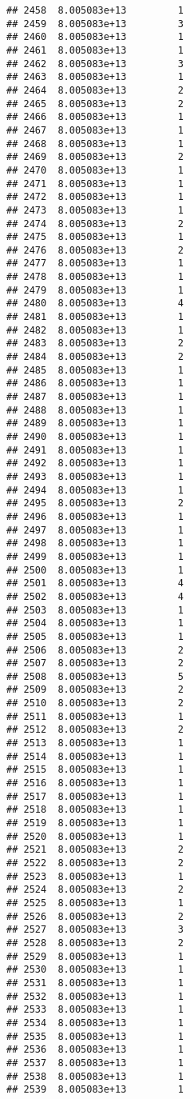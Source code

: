 \documentclass[
]{article}
\begin{document}
\begin{verbatim}
## 2458  8.005083e+13         1
## 2459  8.005083e+13         3
## 2460  8.005083e+13         1
## 2461  8.005083e+13         1
## 2462  8.005083e+13         3
## 2463  8.005083e+13         1
## 2464  8.005083e+13         2
## 2465  8.005083e+13         2
## 2466  8.005083e+13         1
## 2467  8.005083e+13         1
## 2468  8.005083e+13         1
## 2469  8.005083e+13         2
## 2470  8.005083e+13         1
## 2471  8.005083e+13         1
## 2472  8.005083e+13         1
## 2473  8.005083e+13         1
## 2474  8.005083e+13         2
## 2475  8.005083e+13         1
## 2476  8.005083e+13         2
## 2477  8.005083e+13         1
## 2478  8.005083e+13         1
## 2479  8.005083e+13         1
## 2480  8.005083e+13         4
## 2481  8.005083e+13         1
## 2482  8.005083e+13         1
## 2483  8.005083e+13         2
## 2484  8.005083e+13         2
## 2485  8.005083e+13         1
## 2486  8.005083e+13         1
## 2487  8.005083e+13         1
## 2488  8.005083e+13         1
## 2489  8.005083e+13         1
## 2490  8.005083e+13         1
## 2491  8.005083e+13         1
## 2492  8.005083e+13         1
## 2493  8.005083e+13         1
## 2494  8.005083e+13         1
## 2495  8.005083e+13         2
## 2496  8.005083e+13         1
## 2497  8.005083e+13         1
## 2498  8.005083e+13         1
## 2499  8.005083e+13         1
## 2500  8.005083e+13         1
## 2501  8.005083e+13         4
## 2502  8.005083e+13         4
## 2503  8.005083e+13         1
## 2504  8.005083e+13         1
## 2505  8.005083e+13         1
## 2506  8.005083e+13         2
## 2507  8.005083e+13         2
## 2508  8.005083e+13         5
## 2509  8.005083e+13         2
## 2510  8.005083e+13         2
## 2511  8.005083e+13         1
## 2512  8.005083e+13         2
## 2513  8.005083e+13         1
## 2514  8.005083e+13         1
## 2515  8.005083e+13         1
## 2516  8.005083e+13         1
## 2517  8.005083e+13         1
## 2518  8.005083e+13         1
## 2519  8.005083e+13         1
## 2520  8.005083e+13         1
## 2521  8.005083e+13         2
## 2522  8.005083e+13         2
## 2523  8.005083e+13         1
## 2524  8.005083e+13         2
## 2525  8.005083e+13         1
## 2526  8.005083e+13         2
## 2527  8.005083e+13         3
## 2528  8.005083e+13         2
## 2529  8.005083e+13         1
## 2530  8.005083e+13         1
## 2531  8.005083e+13         1
## 2532  8.005083e+13         1
## 2533  8.005083e+13         1
## 2534  8.005083e+13         1
## 2535  8.005083e+13         1
## 2536  8.005083e+13         1
## 2537  8.005083e+13         1
## 2538  8.005083e+13         1
## 2539  8.005083e+13         1

\end{verbatim}
\end{document}
